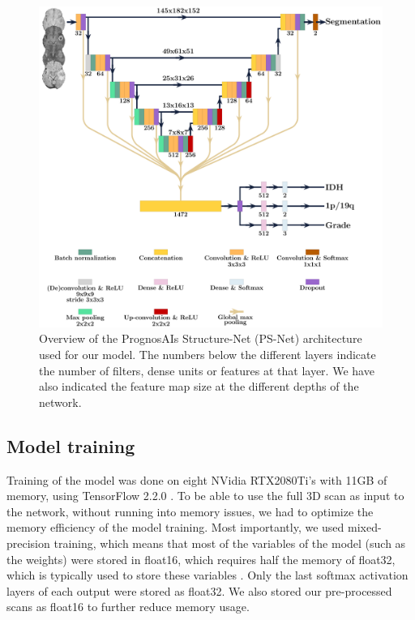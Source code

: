 \begin{figure}
\includegraphics[width=\textwidth]{Figures/PrognosAIs_architecture.pdf}
\caption{Overview of the PrognosAIs Structure-Net (PS-Net) architecture used for our model. The numbers below the different layers indicate the number of filters, dense units or features at that layer.
We have also indicated the feature map size at the different depths of the network.}\label{fig:psnet_architecture}
\end{figure}

\subsection{Model training}

Training of the model was done on eight NVidia RTX2080Ti's with 11GB of memory, using TensorFlow 2.2.0 \autocite{tensorflow2015whitepaper}.
To be able to use the full 3D scan as input to the network, without running into memory issues, we had to optimize the memory efficiency of the model training.
Most importantly, we used mixed-precision training, which means that most of the variables of the model (such as the weights) were stored in float16, which requires half the memory of float32, which is typically used to store these variables \autocite{das2018mixed}.
Only the last softmax activation layers of each output were stored as float32.
We also stored our pre-processed scans as float16 to further reduce memory usage.

